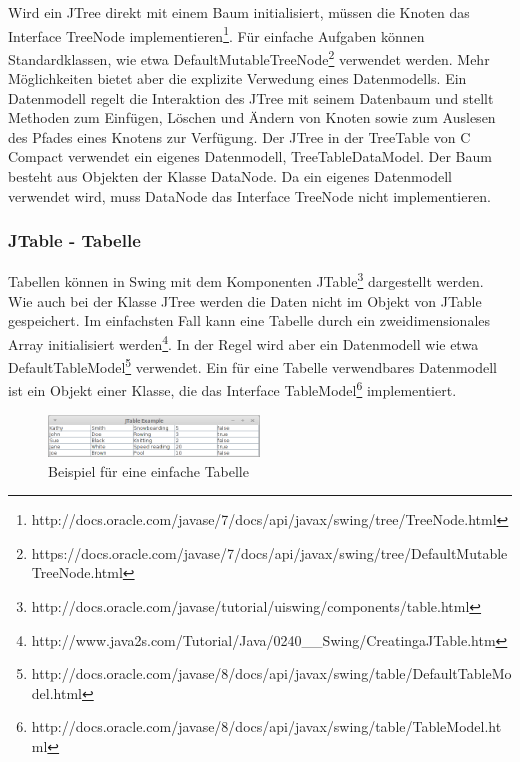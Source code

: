 Wird ein JTree direkt mit einem Baum initialisiert, müssen die Knoten das Interface TreeNode implementieren\footnote{http://docs.oracle.com/javase/7/docs/api/javax/swing/tree/TreeNode.html}. Für einfache Aufgaben können Standardklassen, wie etwa DefaultMutableTreeNode\footnote{https://docs.oracle.com/javase/7/docs/api/javax/swing/tree/DefaultMutableTreeNode.html} verwendet werden.
Mehr Möglichkeiten bietet aber die explizite Verwedung eines Datenmodells. Ein Datenmodell regelt die Interaktion des JTree mit seinem Datenbaum und stellt Methoden zum Einfügen, Löschen und Ändern von Knoten sowie zum Auslesen des Pfades eines Knotens zur Verfügung.
Der JTree in der TreeTable von C Compact verwendet ein eigenes Datenmodell, TreeTableDataModel. Der Baum besteht aus Objekten der Klasse DataNode. Da ein eigenes Datenmodell verwendet wird, muss DataNode das Interface TreeNode nicht implementieren.

\subsubsection*{JTable - Tabelle}
Tabellen können in Swing mit dem Komponenten JTable\footnote{http://docs.oracle.com/javase/tutorial/uiswing/components/table.html} dargestellt werden. Wie auch bei der Klasse JTree werden die Daten nicht im Objekt von JTable gespeichert. Im einfachsten Fall kann eine Tabelle durch ein zweidimensionales Array initialisiert werden\footnote{http://www.java2s.com/Tutorial/Java/0240\_\_Swing/CreatingaJTable.htm}. In der Regel wird aber ein Datenmodell wie etwa DefaultTableModel\footnote{http://docs.oracle.com/javase/8/docs/api/javax/swing/table/DefaultTableModel.html} verwendet. Ein für eine Tabelle verwendbares Datenmodell ist ein Objekt einer Klasse, die das Interface TableModel\footnote{http://docs.oracle.com/javase/8/docs/api/javax/swing/table/TableModel.html} implementiert.

\begin{figure}[h]
\centering
\includegraphics[width=0.5\textwidth]{./media/images/gui/debugger/JTable-Example.png}
\caption{Beispiel für eine einfache Tabelle}
\label{fig:deb-tt-example-jtable}
\end{figure}



